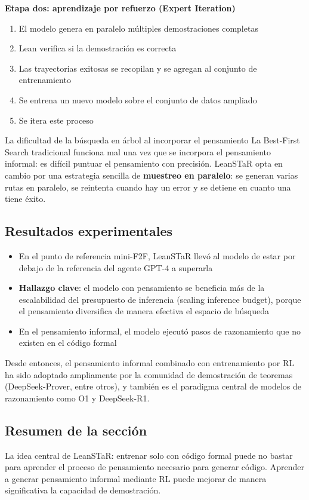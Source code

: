 \textbf{Etapa dos: aprendizaje por refuerzo (Expert Iteration)}
\begin{enumerate}
    \item El modelo genera en paralelo múltiples demostraciones completas
    \item Lean verifica si la demostración es correcta
    \item Las trayectorias exitosas se recopilan y se agregan al conjunto de entrenamiento
    \item Se entrena un nuevo modelo sobre el conjunto de datos ampliado
    \item Se itera este proceso
\end{enumerate}

\begin{warningbox}{La dificultad de la búsqueda en árbol al incorporar el pensamiento}
La Best-First Search tradicional funciona mal una vez que se incorpora el pensamiento informal: es difícil puntuar el pensamiento con precisión. LeanSTaR opta en cambio por una estrategia sencilla de \textbf{muestreo en paralelo}: se generan varias rutas en paralelo, se reintenta cuando hay un error y se detiene en cuanto una tiene éxito.
\end{warningbox}

\subsection{Resultados experimentales}

\begin{itemize}
    \item En el punto de referencia mini-F2F, LeanSTaR llevó al modelo de estar por debajo de la referencia del agente GPT-4 a superarla
    \item \textbf{Hallazgo clave}: el modelo con pensamiento se beneficia más de la escalabilidad del presupuesto de inferencia (scaling inference budget), porque el pensamiento diversifica de manera efectiva el espacio de búsqueda
    \item En el pensamiento informal, el modelo ejecutó pasos de razonamiento que no existen en el código formal
\end{itemize}

Desde entonces, el pensamiento informal combinado con entrenamiento por RL ha sido adoptado ampliamente por la comunidad de demostración de teoremas (DeepSeek-Prover, entre otros), y también es el paradigma central de modelos de razonamiento como O1 y DeepSeek-R1.

\subsection{Resumen de la sección}

La idea central de LeanSTaR: entrenar solo con código formal puede no bastar para aprender el proceso de pensamiento necesario para generar código. Aprender a generar pensamiento informal mediante RL puede mejorar de manera significativa la capacidad de demostración.
